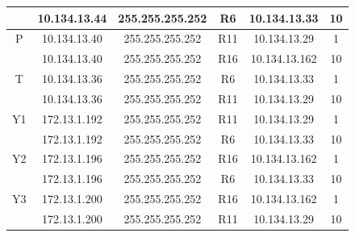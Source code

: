 \documentclass[12pt, a4paper, spanish]{article}
\begin{document}
\begin{center}
\begin{tabular}{|c|c|c|c|c|c|}
	 & 10.134.13.44 & 255.255.255.252 & R6 & 10.134.13.33 & 10\\
	\hline
	P & 10.134.13.40 & 255.255.255.252 & R11 & 10.134.13.29 & 1\\
	 & 10.134.13.40 & 255.255.255.252 & R16 & 10.134.13.162 & 10\\
	\hline
	T & 10.134.13.36 & 255.255.255.252 & R6 & 10.134.13.33 & 1\\
	 & 10.134.13.36 & 255.255.255.252 & R11 & 10.134.13.29 & 10\\
	\hline
	Y1 & 172.13.1.192 & 255.255.255.252 & R11 & 10.134.13.29 & 1\\
	 & 172.13.1.192 & 255.255.255.252 & R6 & 10.134.13.33 & 10\\
	\hline
	Y2 & 172.13.1.196 & 255.255.255.252 & R16 & 10.134.13.162 & 1\\
	 & 172.13.1.196 & 255.255.255.252 & R6 & 10.134.13.33 & 10\\
	\hline
	Y3 & 172.13.1.200 & 255.255.255.252 & R16 & 10.134.13.162 & 1\\
	 & 172.13.1.200 & 255.255.255.252 & R11 & 10.134.13.29 & 10\\
	\hline
\end{tabular}
\end{center}
\end{document}
